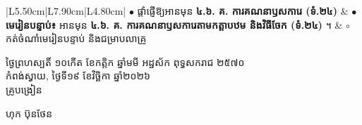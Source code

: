 \documentclass[a4paper,10pt]{article}
\begin{document}
\begin{longtable}{|L{5.50cm}|L{7.90cm}|L{4.80cm}|}
$\bullet$ ផ្ដាំផ្ញើឱ្យអានមុន \textbf{៤.៦. គ. ការគណនាឫសការេ (ទំ.២៤)}
&
$\bullet$ \textbf{មេរៀនបន្ទាប់៖} អានមុន \textbf{៤.៦. គ. ការគណនាឫសការេតាមកត្តាបឋម និងវិធីចែក (ទំ.២៤)} ។
&
$\circ$ កត់ចំណាំមេរៀនបន្ទាប់ និងជម្រាបលាគ្រូ \\
\end{longtable}

\vspace{6pt}
\hfill
\begin{minipage}{10.5cm}
  {\centering
    ថ្ងៃព្រហស្បតិ៍ ១០កើត ខែកត្តិក ឆ្នាំមមី អដ្ឋស័ក ពុទ្ធសករាជ ២៥៧០\\[2pt]
    កំពង់ស្វាយ, ថ្ងៃទី១៩ ខែវិច្ឆិកា ឆ្នាំ២០២៦\\[3pt]
    {\muol គ្រូបង្រៀន}\par}
  \vspace{28pt}
  \hfill{\muol ហុក ប៊ុនថែន}\hspace*{1.4cm}
\end{minipage}
\end{document}
